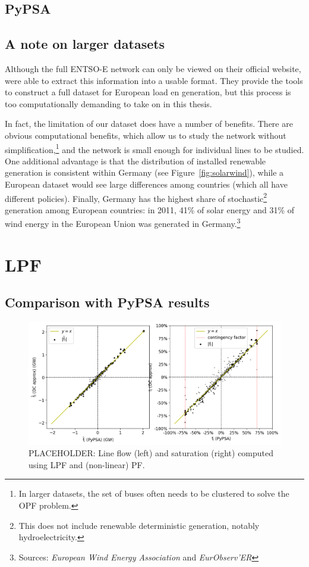\documentclass[main.tex]{subfiles}
\begin{document}
\subsection{PyPSA}

\subsection{A note on larger datasets}
Although the full ENTSO-E network can only be viewed on their official website, \cite{PyPSAEUR} were able to extract this information into a usable format. They provide the tools to construct a full dataset for European load en generation, but this process is too computationally demanding to take on in this thesis. 

In fact, the limitation of our dataset does have a number of benefits. There are obvious computational benefits, which allow us to study the network without simplification,\footnote{In larger datasets, the set of buses often needs to be clustered to solve the OPF problem.} and the network is small enough for individual lines to be studied. One additional advantage is that the distribution of installed renewable generation is consistent within Germany (see Figure~\ref{fig:solarwind}), while a European dataset would see large differences among countries (which all have different policies). Finally, Germany has the highest share of stochastic\footnote{This does not include renewable deterministic generation, notably hydroelectricity.} generation among European countries: in 2011, 41\% of solar energy and 31\% of wind energy in the European Union was generated in Germany.\footnote{Sources: \emph{European Wind Energy Association} and \emph{EurObserv’ER}}

\section{LPF}
\subsection{Comparison with PyPSA results}
\begin{figure}
    \centering
    \includegraphics[width=\textwidth]{img/lineflowcorr.png}
    \caption{PLACEHOLDER: Line flow (left) and saturation (right) computed using LPF and (non-linear) PF.}
    \label{fig:generationtech}
\end{figure}
\end{document}
